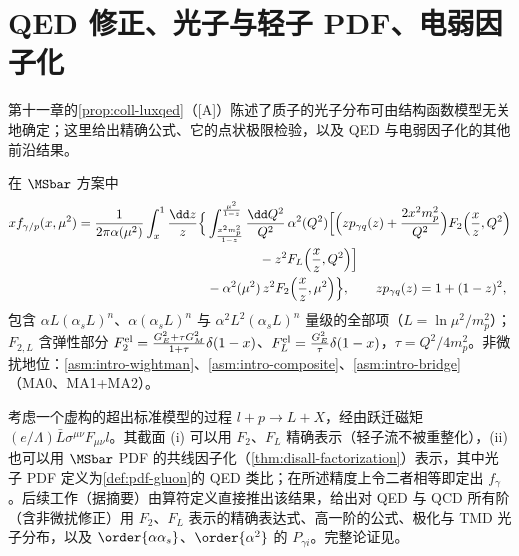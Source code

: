 \section{QED 修正、光子与轻子 PDF、电弱因子化}\label{sec:front-qed}

第十一章的\cref{prop:coll-luxqed}（[A]）陈述了质子的光子分布可由结构函数模型无关地确定；这里给出精确公式、它的点状极限检验，以及 QED 与电弱因子化的其他前沿结果。

\begin{theorem}\label{thm:front-luxqed}
在 $\MSbar$ 方案中
\begin{equation}\label{eq:front-luxqed}
\begin{split}
xf_{\gamma/p}(x,\mu^2)=\frac{1}{2\pi\alpha(\mu^2)}\int_x^1\frac{\dd z}{z}\Bigl\{&\int_{\frac{x^2m_p^2}{1-z}}^{\frac{\mu^2}{1-z}}\frac{\dd Q^2}{Q^2}\,\alpha^2(Q^2)\Bigl[\Bigl(zp_{\gamma q}(z)+\frac{2x^2m_p^2}{Q^2}\Bigr)F_2\Bigl(\frac xz,Q^2\Bigr)\\
&\qquad\qquad-z^2F_L\Bigl(\frac xz,Q^2\Bigr)\Bigr]\\
&-\alpha^2(\mu^2)\,z^2F_2\Bigl(\frac xz,\mu^2\Bigr)\Bigr\},\qquad zp_{\gamma q}(z)=1+(1-z)^2,
\end{split}
\end{equation}
包含 $\alpha L(\alpha_sL)^n$、$\alpha(\alpha_sL)^n$ 与 $\alpha^2L^2(\alpha_sL)^n$ 量级的全部项（$L=\ln\mu^2/m_p^2$）；$F_{2,L}$ 含弹性部分 $F_2^{\rm el}=\frac{G_E^2+\tau G_M^2}{1+\tau}\delta(1-x)$、$F_L^{\rm el}=\frac{G_E^2}{\tau}\delta(1-x)$，$\tau=Q^2/4m_p^2$\cite[式~(6)]{Manohar:2016nzj}。非微扰地位：\cref{asm:intro-wightman}、\cref{asm:intro-composite}、\cref{asm:intro-bridge}（MA0、MA1+MA2）。
\end{theorem}

\begin{proofsketch}
考虑一个虚构的超出标准模型的过程 $l+p\to L+X$，经由跃迁磁矩 $(e/\Lambda)\bar L\sigma^{\mu\nu}F_{\mu\nu}l$。其截面 (i) 可以用 $F_2$、$F_L$ 精确表示（轻子流不被重整化），(ii) 也可以用 $\MSbar$ PDF 的共线因子化（\cref{thm:disall-factorization}）表示，其中光子 PDF 定义为\cref{def:pdf-gluon}的 QED 类比；在所述精度上令二者相等即定出 $f_\gamma$。后续工作\cite{Manohar:2017eqh}（据摘要）由算符定义直接推出该结果，给出对 QED 与 QCD 所有阶（含非微扰修正）用 $F_2$、$F_L$ 表示的精确表达式、高一阶的公式、极化与 TMD 光子分布，以及 $\order{\alpha\alpha_s}$、$\order{\alpha^2}$ 的 $P_{\gamma i}$。完整论证见\cite{Manohar:2016nzj,Manohar:2017eqh}。
\end{proofsketch}

